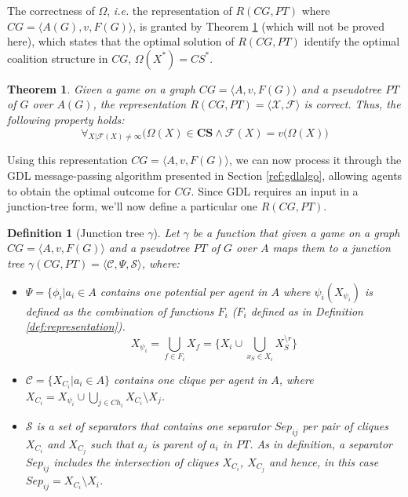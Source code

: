 \documentclass[11pt, twoside, titlepage, a4paper, openright]{report}
\newtheorem{Def}{Definition}
\newtheorem{Th}{Theorem}
\begin{document}
\noindent The correctness of $\Omega$, \textit{i.e.} the representation of $R(CG, PT)$ where $CG = \langle A(G),v,F(G)\rangle$, is granted by Theorem \ref{th:omegacorrect} (which will not be proved here), which states that the optimal solution of $R(CG,PT)$ identify the optimal
coalition structure in $CG$, $\Omega(X^*)=CS^*$. 

\begin{Th}\label{th:omegacorrect}
Given a game on a graph $CG=\langle A, v, F(G)\rangle$ and a pseudotree $PT$ of $G$ over $A(G)$, the representation $R(CG,PT)=\langle\mathcal{X},\mathcal{F}\rangle$ is correct. Thus, the following property holds:
$$
\forall_{X|\mathcal{F}(X)\neq\infty}\big(\Omega(X)\in\mathbf{CS}\wedge\mathcal{F}(X)=v(\Omega(X)\big)
$$
\end{Th}

\noindent Using this representation $CG=\langle A, v, F(G)\rangle$, we can now process it through the GDL message-passing algorithm presented in Section \ref{ref:gdlalgo}, allowing agents to obtain the optimal outcome for $CG$. Since GDL requires an input in a junction-tree form, we'll now define a particular one $R(CG,PT)$.

\begin{Def}[Junction tree $\gamma$]
Let $\gamma$ be a function that given a game on a graph $CG=\langle A, v, F(G)\rangle$ and a pseudotree $PT$ of $G$ over $A$ maps them to a junction tree $\gamma(CG,PT) = \langle\mathcal{C}, \Psi, \mathcal{S}\rangle$, where:
\begin{itemize}
\item $\Psi=\{\phi_i|a_i\in A$ contains one potential per agent in $A$ where $\psi_i(X_{\psi_i})$ is defined as the combination of functions $F_i$ ($F_i$ defined as in Definition \ref{def:representation}). $$X_{\psi_i}=\bigcup_{f\in F_i}X_f=\{X_i\cup\bigcup_{x_S\in X_i}X^{\setminus r}_S\}$$
\item $\mathcal{C}=\{X_{C_i}|a_i\in A\}$ contains one clique per agent in $A$, where $X_{C_i}=X_{\psi_i}\cup\bigcup_{j\in Ch_i}X_{C_i}\setminus X_j$.
\item $\mathcal{S}$ is a set of separators that contains one separator $Sep_{ij}$ per pair of cliques $X_{C_i}$ and $X_{C_j}$ such that $a_j$ is parent of $a_i$ in $PT$. As in definition, a separator $Sep_{ij}$ includes the intersection of cliques $X_{C_i}$, $X_{C_j}$ and hence, in this case $Sep_{ij} = X_{C_i} \setminus X_i$.
\end{itemize}
\end{Def}
\end{document}
